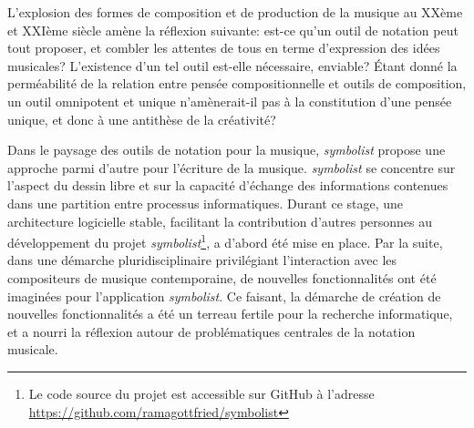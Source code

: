 L'explosion des formes de composition et de production de la musique au XXème et XXIème siècle amène la réflexion suivante: est-ce qu'un outil de notation peut tout proposer, et combler les attentes de tous en terme d'expression des idées musicales? L'existence d'un tel outil est-elle nécessaire, enviable?
Étant donné la perméabilité de la relation entre pensée compositionnelle et outils de composition, un outil omnipotent et unique n'amènerait-il pas à la constitution d'une pensée unique, et donc à une antithèse de la créativité?

Dans le paysage des outils de notation pour la musique, \textit{symbolist} propose une approche parmi d'autre pour l'écriture de la musique. \textit{symbolist} se concentre sur l'aspect du dessin libre et sur la capacité d'échange des informations contenues dans une partition entre processus informatiques.
Durant ce stage, une architecture logicielle stable, facilitant la contribution d'autres personnes au développement du projet \textit{symbolist}\footnote{Le code source du projet est accessible sur GitHub à l'adresse \url{https://github.com/ramagottfried/symbolist}}, a d'abord été mise en place. Par la suite, dans une démarche pluridisciplinaire privilégiant l'interaction avec les compositeurs de musique contemporaine, de nouvelles fonctionnalités ont été imaginées pour l'application \textit{symbolist}. Ce faisant, la démarche de création de nouvelles fonctionnalités a été un terreau fertile pour la recherche informatique, et a nourri la réflexion autour de problématiques centrales de la notation musicale.